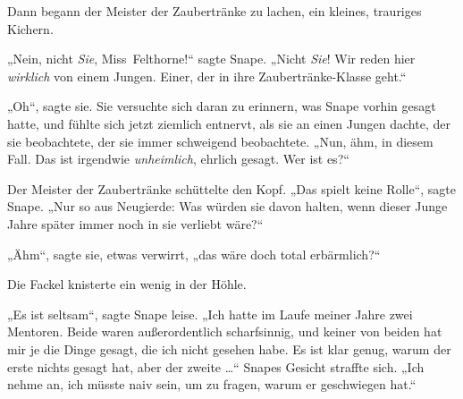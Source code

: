 Dann begann der Meister der Zaubertränke zu lachen, ein kleines, trauriges Kichern.

„Nein, nicht \emph{Sie}, Miss~Felthorne!“ sagte Snape.
„Nicht \emph{Sie}! Wir reden hier \emph{wirklich} von einem Jungen. Einer, der in ihre Zaubertränke-Klasse geht.“

„Oh“, sagte sie. Sie versuchte sich daran zu erinnern, was Snape vorhin gesagt hatte, und fühlte sich jetzt ziemlich entnervt, als sie an einen Jungen dachte, der sie beobachtete, der sie immer schweigend beobachtete.
„Nun, ähm, in diesem Fall. Das ist irgendwie \emph{unheimlich}, ehrlich gesagt. Wer ist es?“

Der Meister der Zaubertränke schüttelte den Kopf.
„Das spielt keine Rolle“, sagte Snape.
„Nur so aus Neugierde: Was würden sie davon halten, wenn dieser Junge Jahre später immer noch in sie verliebt wäre?“

„Ähm“, sagte sie, etwas verwirrt, „das wäre doch total erbärmlich?“

Die Fackel knisterte ein wenig in der Höhle.

„Es ist seltsam“, sagte Snape leise.
„Ich hatte im Laufe meiner Jahre zwei Mentoren. Beide waren außerordentlich scharfsinnig, und keiner von beiden hat mir je die Dinge gesagt, die ich nicht gesehen habe. Es ist klar genug, warum der erste nichts gesagt hat, aber der zweite …“ Snapes Gesicht straffte sich.
„Ich nehme an, ich müsste naiv sein, um zu fragen, warum er geschwiegen hat.“

